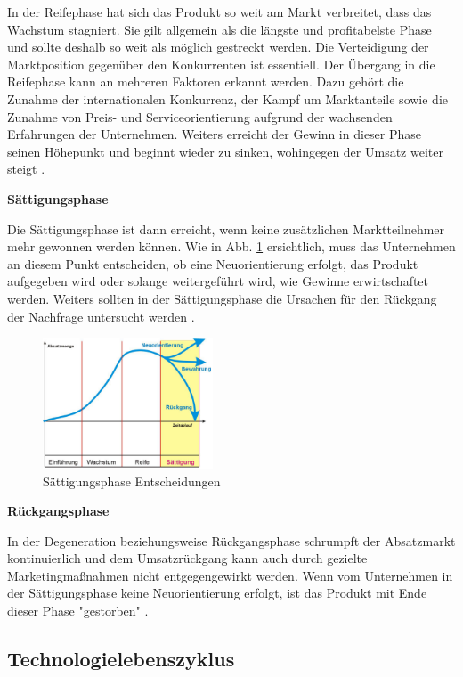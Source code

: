 In der Reifephase hat sich das Produkt so weit am Markt verbreitet, dass das Wachstum stagniert. Sie gilt allgemein als die längste und profitabelste Phase und sollte deshalb so weit als möglich gestreckt werden. Die Verteidigung der Marktposition gegenüber den Konkurrenten ist essentiell. Der Übergang in die Reifephase kann an mehreren Faktoren erkannt werden. Dazu gehört die Zunahme der internationalen Konkurrenz, der Kampf um Marktanteile sowie die Zunahme von Preis- und Serviceorientierung aufgrund der wachsenden Erfahrungen der Unternehmen. Weiters erreicht der Gewinn in dieser Phase seinen Höhepunkt und beginnt wieder zu sinken, wohingegen der Umsatz weiter steigt \cite{Poeschek00}.

\textbf{Sättigungsphase}

Die Sättigungsphase ist dann erreicht, wenn keine zusätzlichen Marktteilnehmer mehr gewonnen werden können. Wie in Abb. \ref{img:saettigung} ersichtlich, muss das Unternehmen an diesem Punkt entscheiden, ob eine Neuorientierung erfolgt, das Produkt aufgegeben wird oder solange weitergeführt wird, wie Gewinne erwirtschaftet werden. Weiters sollten in der Sättigungsphase die Ursachen für den Rückgang der Nachfrage untersucht werden \cite{Poeschek00}.

\begin{figure}[h!]
	\centering
	\includegraphics[width=0.45\textwidth]{BilderAllgemein/saettigung.png}
	\caption{Sättigungsphase Entscheidungen \cite{Poeschek00}}
	\label{img:saettigung}
\end{figure}

\textbf{Rückgangsphase}

In der Degeneration beziehungsweise Rückgangsphase schrumpft der Absatzmarkt kontinuierlich und dem Umsatzrückgang kann auch durch gezielte Marketingmaßnahmen nicht entgegengewirkt werden. Wenn vom Unternehmen in der Sättigungsphase keine Neuorientierung erfolgt, ist das Produkt mit Ende dieser Phase "gestorben" \cite{Poeschek00}.

\subsection{Technologielebenszyklus}

